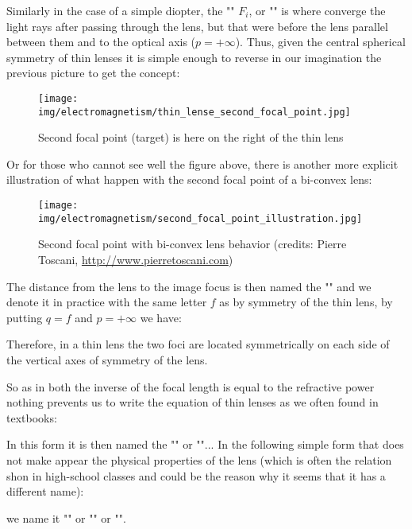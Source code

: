 	Similarly in the case of a simple diopter, the "" $F_i$, or "" is where converge the light rays after passing through the lens, but that were before the lens parallel between them and to the optical axis ($p=+\infty$). Thus, given the central spherical symmetry of thin lenses it is simple enough to reverse in our imagination the previous picture to get the concept:
	\begin{figure}[H]
		\centering
		\texttt{[image: img/electromagnetism/thin\_lense\_second\_focal\_point.jpg]}
		\caption{Second focal point (target) is here on the right of the thin lens}
	\end{figure}
	Or for those who cannot see well the figure above, there is another more explicit illustration of what happen with the second focal point of a bi-convex lens:
	\begin{figure}[H]
		\centering
		\texttt{[image: img/electromagnetism/second\_focal\_point\_illustration.jpg]}
		\caption{Second focal point with bi-convex lens behavior (credits: Pierre Toscani, \url{http://www.pierretoscani.com})}
	\end{figure}
	The distance from the lens to the image focus is then named the "" and we denote it in practice with the same letter $f$ as by symmetry of the thin lens, by putting $q=f$ and $p=+\infty$ we have:
	
	Therefore, in a thin lens the two foci are located symmetrically on each side of the vertical axes of symmetry of the lens.

	So as in both the inverse of the focal length is equal to the refractive power nothing prevents us to write the equation of thin lenses as we often found in textbooks:
	
	In this form it is then named the "" or ""... In the following simple form that does not make appear the physical properties of the lens (which is often the relation shon in high-school classes and could be the reason why it seems that it has a different name):
	
	we name it "" or "" or "".

